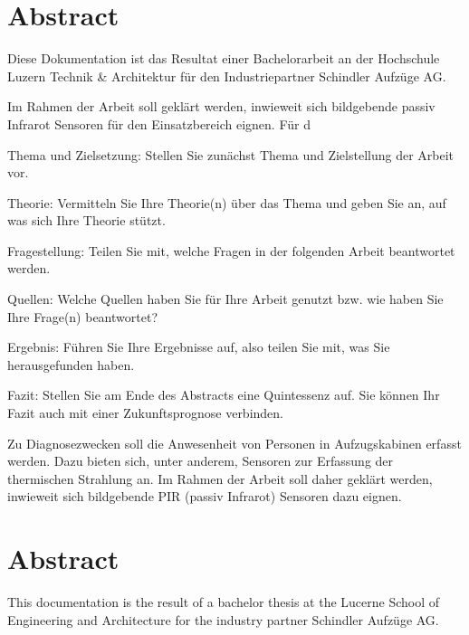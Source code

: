 \chapter*{Abstract}
\label{chap:abstract_german}
Diese Dokumentation ist das Resultat einer Bachelorarbeit an der Hochschule Luzern Technik \& Architektur für den Industriepartner Schindler Aufzüge AG. 




Im Rahmen der Arbeit soll geklärt werden, inwieweit sich bildgebende passiv Infrarot Sensoren für den Einsatzbereich eignen. Für d


Thema und Zielsetzung: Stellen Sie zunächst Thema und Zielstellung der Arbeit vor.

Theorie: Vermitteln Sie Ihre Theorie(n) über das Thema und geben Sie an, auf was sich Ihre Theorie stützt.

Fragestellung: Teilen Sie mit, welche Fragen in der folgenden Arbeit beantwortet werden.

Quellen: Welche Quellen haben Sie für Ihre Arbeit genutzt bzw. wie haben Sie Ihre Frage(n) beantwortet?

Ergebnis: Führen Sie Ihre Ergebnisse auf, also teilen Sie mit, was Sie herausgefunden haben.

Fazit: Stellen Sie am Ende des Abstracts eine Quintessenz auf. Sie können Ihr Fazit auch mit einer Zukunftsprognose verbinden.


Zu Diagnosezwecken soll die Anwesenheit von Personen in Aufzugskabinen erfasst werden. Dazu bieten sich, unter anderem, Sensoren zur Erfassung der thermischen Strahlung an. Im Rahmen der Arbeit soll daher geklärt werden, inwieweit sich bildgebende PIR (passiv Infrarot) Sensoren dazu eignen. 


\chapter*{Abstract}
\label{chap:abstract_english}

This documentation is the result of a bachelor thesis at the Lucerne School
of Engineering and Architecture for the industry partner Schindler Aufzüge AG.

